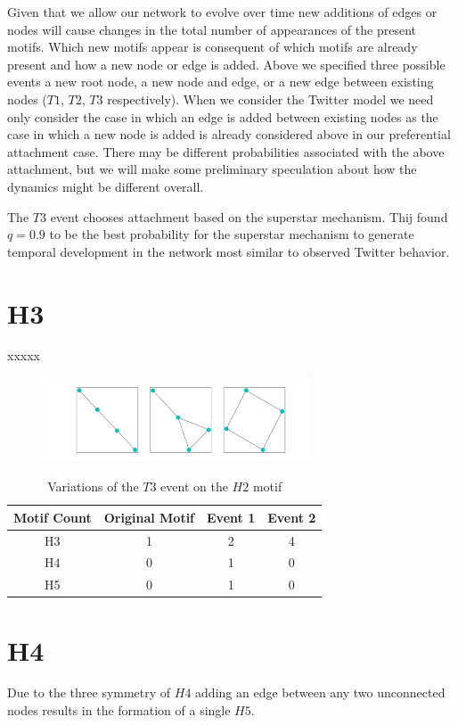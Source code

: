 Given that we allow our network to evolve over time new additions of edges or nodes will cause changes
in the total number of appearances of the present motifs. Which new motifs appear is consequent of
which motifs are already present and how a new node or edge is added. Above we specified three possible
events a new root node, a new node and edge, or a new edge between existing nodes 
($T1$, $T2$, $T3$ respectively). When we consider the Twitter model we need only consider the 
case in which an edge is added between existing nodes as the case in which a new node is added is already
considered above in our preferential attachment case. There may be different probabilities associated with the 
above attachment, but we will make some preliminary speculation about how the dynamics might be different overall.

The $T3$ event chooses attachment based on the superstar mechanism. Thij found $q=0.9$ to be the best 
probability for the superstar mechanism to generate temporal development in the network
most similar to observed Twitter behavior. \cite{thij} 

\section{H3}
xxxxx
\begin{figure}[!ht]
    \includegraphics[width=8cm]{Images/H3_T3_evolution.png}
    \centering
\end{figure}

\begin{table}
    \centering
    \begin{tabular}{||c c c c||} 
    \hline
    Motif Count & Original Motif & Event 1 & Event 2\\ [0.5ex] 
    \hline\hline
    H3 & 1 & 2 & 4\\ 
    \hline
    H4 & 0& 1 & 0  \\
    \hline
    H5 & 0& 1 & 0  \\
    \hline
   \end{tabular}
   \caption{Variations of the $T3$ event on the $H2$ motif}
   \label{table:12}
\end{table}

\section{H4}
Due to the three symmetry of $H4$ adding an edge between any two unconnected nodes results in 
the formation of a single $H5$.

